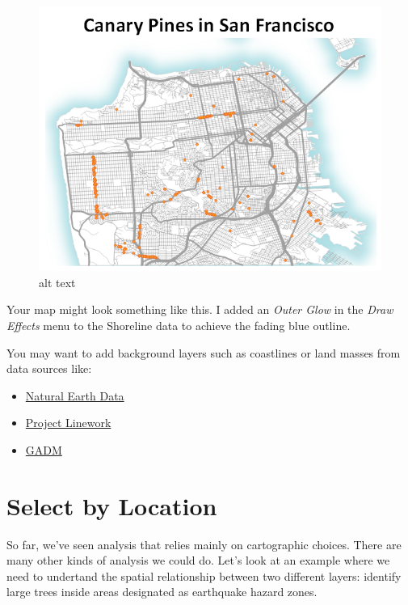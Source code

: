 \documentclass[
]{article}
\providecommand{\tightlist}{%
  \setlength{\itemsep}{0pt}\setlength{\parskip}{0pt}}
\begin{document}
\begin{figure}
\centering
\includegraphics{./images/Map_CanaryPineLocations.png}
\caption{alt text}
\end{figure}

Your map might look something like this. I added an \emph{Outer Glow} in the \emph{Draw Effects} menu to the Shoreline data to achieve the fading blue outline.

You may want to add background layers such as coastlines or land masses from data sources like:

\begin{itemize}
\tightlist
\item
  \href{http://naturalearthdata.com/}{Natural Earth Data}
\item
  \href{http://www.projectlinework.org/}{Project Linework}
\item
  \href{https://gadm.org/}{GADM}
\end{itemize}

\hypertarget{select-by-location}{%
\section{Select by Location}\label{select-by-location}}

So far, we've seen analysis that relies mainly on cartographic choices. There are many other kinds of analysis we could do. Let's look at an example where we need to undertand the spatial relationship between two different layers: identify large trees inside areas designated as earthquake hazard zones.
\end{document}
